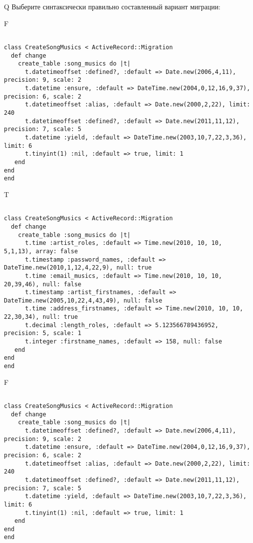 Q
Выберите синтаксически правильно составленный вариант миграции:

F
\begin{verbatim}
		
class CreateSongMusics < ActiveRecord::Migration 
  def change 
    create_table :song_musics do |t| 
      t.datetimeoffset :defined?, :default => Date.new(2006,4,11), precision: 9, scale: 2
      t.datetime :ensure, :default => DateTime.new(2004,0,12,16,9,37), precision: 6, scale: 2
      t.datetimeoffset :alias, :default => Date.new(2000,2,22), limit: 240
      t.datetimeoffset :defined?, :default => Date.new(2011,11,12), precision: 7, scale: 5
      t.datetime :yield, :default => DateTime.new(2003,10,7,22,3,36), limit: 6
      t.tinyint(1) :nil, :default => true, limit: 1
   end
end
end
\end{verbatim}

T
\begin{verbatim}
		
class CreateSongMusics < ActiveRecord::Migration 
  def change 
    create_table :song_musics do |t| 
      t.time :artist_roles, :default => Time.new(2010, 10, 10, 5,1,13), array: false
      t.timestamp :password_names, :default => DateTime.new(2010,1,12,4,22,9), null: true
      t.time :email_musics, :default => Time.new(2010, 10, 10, 20,39,46), null: false
      t.timestamp :artist_firstnames, :default => DateTime.new(2005,10,22,4,43,49), null: false
      t.time :address_firstnames, :default => Time.new(2010, 10, 10, 22,30,34), null: true
      t.decimal :length_roles, :default => 5.123566789436952, precision: 5, scale: 1
      t.integer :firstname_names, :default => 158, null: false
   end
end
end
\end{verbatim}

F
\begin{verbatim}
		
class CreateSongMusics < ActiveRecord::Migration 
  def change 
    create_table :song_musics do |t| 
      t.datetimeoffset :defined?, :default => Date.new(2006,4,11), precision: 9, scale: 2
      t.datetime :ensure, :default => DateTime.new(2004,0,12,16,9,37), precision: 6, scale: 2
      t.datetimeoffset :alias, :default => Date.new(2000,2,22), limit: 240
      t.datetimeoffset :defined?, :default => Date.new(2011,11,12), precision: 7, scale: 5
      t.datetime :yield, :default => DateTime.new(2003,10,7,22,3,36), limit: 6
      t.tinyint(1) :nil, :default => true, limit: 1
   end
end
end
\end{verbatim}

